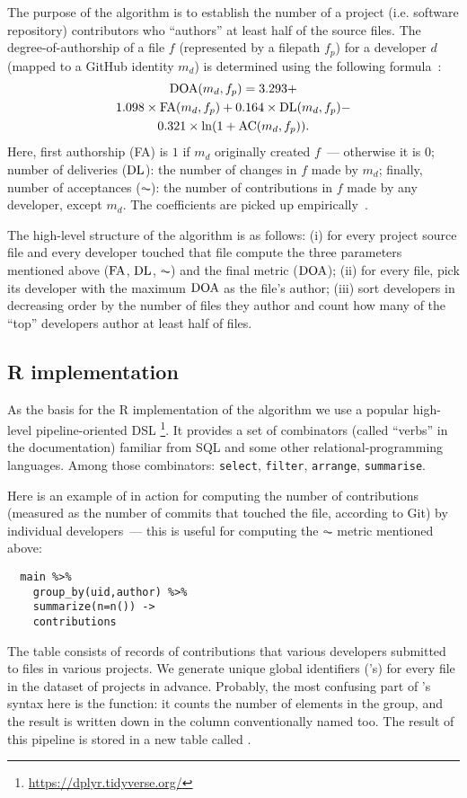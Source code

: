 The purpose of the algorithm is to establish the number of a project
(i.e. software repository) contributors who ``authors'' at least half of
the source files. The degree-of-authorship of a file $f$ (represented
by a filepath $f_p$)
for a developer $d$ (mapped to a GitHub identity $m_d$)
is determined using the following formula~\cite{tf}:
\begin{multline}
\operatorname{DOA}(m_d, f_p) =
  3.293 + \\
  1.098\times \operatorname{FA}(m_d, f_p) +
  0.164\times \operatorname{DL}(m_d, f_p) - \\
  0.321\times \ln(1 + \operatorname{AC}(m_d, f_p)).
\end{multline}
Here, first authorship (FA) is $1$ if $m_d$ originally created $f$~---
otherwise it is $0$; number of deliveries ($\operatorname{DL}$): the number of changes in $f$
made by $m_d$; finally, number of acceptances ($\AC$): the number of
contributions in $f$ made by any developer, except $m_d$. The coefficients
are picked up empirically~\cite{doa}.

The high-level structure of the algorithm is as follows: (i) for every project
source file and every developer touched that file compute the three
parameters mentioned above ($\operatorname{FA}$, $\operatorname{DL}$, $\AC$) and the final metric ($\operatorname{DOA}$);
(ii) for every file, pick its developer with the maximum $\operatorname{DOA}$ as the file's
author; (iii) sort developers in decreasing order by the number of files
they author and count how many of the ``top'' developers author at least
half of files.

\subsection{R implementation}

As the basis for the R implementation of the algorithm we use a popular high-level
pipeline-oriented DSL \dplyr\footnote{%
\url{https://dplyr.tidyverse.org/}%
}. It provides a set of combinators (called ``verbs'' in the documentation)
familiar from SQL and some other relational-programming languages. Among those
combinators:
\texttt{select},
\texttt{filter},
\texttt{arrange},
\texttt{summarise}.

Here is an example of \dplyr in action for computing the number of contributions
(measured as the number of commits that touched the file, according to Git) by individual
developers~--- this is useful for computing the $\AC$ metric mentioned above:
\begin{verbatim}
  main %>%
    group_by(uid,author) %>%
    summarize(n=n()) ->
    contributions
\end{verbatim}
The  table consists of records of contributions that various developers
submitted to files in various projects.
We generate unique global identifiers ('s) for every file in the
dataset of projects in advance. Probably, the most confusing part of \dplyr's
syntax here is the  function: it counts the number of elements in the
group, and the result is written down in the column conventionally named 
too. The result of this pipeline is stored in a new table called .


